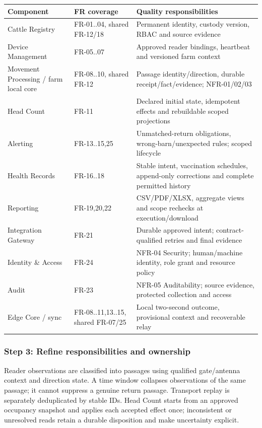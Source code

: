 {\small
\begin{longtable}[]{|>{\raggedright\arraybackslash}p{}|>{\raggedright\arraybackslash}p{}|>{\raggedright\arraybackslash}p{}|}
\hline
\textbf{Component} & \textbf{FR coverage} & \textbf{Quality responsibilities} \\ \hline
\endhead
Cattle Registry & FR-01..04, shared FR-12/18 & Permanent identity,
custody version, RBAC and source evidence \\ \hline
Device Management & FR-05..07 & Approved reader bindings, heartbeat and
versioned farm context \\ \hline
Movement Processing / farm local core & FR-08..10, shared FR-12 &
Passage identity/direction, durable receipt/fact/evidence;
NFR-01/02/03 \\ \hline
Head Count & FR-11 & Declared initial state, idempotent effects and
rebuildable scoped projections \\ \hline
Alerting & FR-13..15,25 & Unmatched-return obligations,
wrong-barn/unexpected rules; scoped lifecycle \\ \hline
Health Records & FR-16..18 & Stable intent, vaccination schedules,
append-only corrections and complete permitted history \\ \hline
Reporting & FR-19,20,22 & CSV/PDF/XLSX, aggregate views and scope
rechecks at execution/download \\ \hline
Integration Gateway & FR-21 & Durable approved intent;
contract-qualified retries and final evidence \\ \hline
Identity \& Access & FR-24 & NFR-04 Security; human/machine identity,
role grant and resource policy \\ \hline
Audit & FR-23 & NFR-05 Auditability; source evidence, protected
collection and access \\ \hline
Edge Core / sync & FR-08..11,13..15, shared FR-07/25 & Local two-second
outcome, provisional context and recoverable relay \\ \hline
\end{longtable}
}

\subsubsection{Step 3: Refine responsibilities and ownership}

Reader observations are classified into passages using qualified
gate/antenna context and direction state. A time window collapses
observations of the same passage; it cannot suppress a genuine return
passage. Transport replay is separately deduplicated by stable IDs. Head
Count starts from an approved occupancy snapshot and applies each
accepted effect once; inconsistent or unresolved reads retain a durable
disposition and make uncertainty explicit.

